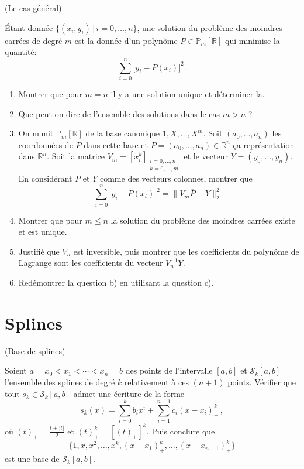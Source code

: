 \documentclass[a4paper,12pt,reqno]{amsart}
\begin{document}
\begin{exo} (Le cas général)

  Étant donnée $\{(x_{i} ,y_{i}) \,|\, i = 0,\ldots,n\}$, une solution du problème des moindres carrées de degré $m$ est la donnée d'un polynôme $P \in \mathbb{P}_{m}[\mathbb{R}]$ qui minimise la quantité:
    $$
        \sum_{i=0}^{n} \big[y_{i} - P(x_{i})\big]^{2}.
    $$

  \begin{enumerate}
    \item Montrer que pour $m=n$ il y a une solution unique et déterminer la.
    \item Que peut on dire de l'ensemble des solutions dans le cas $m>n$ ?
    \item On munit $\mathbb{P}_{m}[\mathbb{R}]$ de la base canonique $1,X,\ldots,X^{m}$. Soit $(a_{0},\ldots,a_{n})$ les coordonnées de $P$ dans cette base et $\overline{P}=(a_{0},\ldots,a_{n}) \in \mathbb{R}^{n}$ ça représentation dans $\mathbb{R}^{n}$. Soit la matrice $V_{m}=\left[x_{i}^{k}\right]_{\substack{i=0,\ldots,n\\ k=0,\ldots,m}}$ et le vecteur $Y=(y_{0},\ldots,y_{n})$. En considérant $\overline{P}$ et $Y$ comme des vecteurs colonnes, montrer que
      $$
        \sum_{i=0}^{n} \big[y_{i} - P(x_{i})\big]^{2} = \big\| V_{m}\overline{P}-Y \big\|_{2}^{2}.
      $$
    \item Montrer que pour $m \leq n$ la solution du problème des moindres carrées existe et est unique.
    \item Justifié que $V_{n}$ est inversible, puis montrer que les coefficients du polynôme de Lagrange sont les coefficients du vecteur $V_{n}^{-1}Y$.
    \item Redémontrer la question b) en utilisant la question c).
  \end{enumerate}
\end{exo}


\section{Splines}

\begin{exo} (Base de splines)

  Soient $a=x_0 < x_1 < \cdots < x_{n}=b$ des points de l'intervalle $[a,b]$ et $\mathcal{S}_{k}[a,b]$ l'ensemble des splines de degré $k$ relativement à ces $(n+1)$ points. Vérifier que tout $s_{k} \in \mathcal{S}_{k}[a,b]$ admet une écriture de la forme
  $$
    s_{k}(x) = \sum_{i=0}^{k} b_{i}x^{i} + \sum_{i=1}^{n-1} c_{i}(x - x_{i})_{+}^{k}\,,
  $$
  où $(t)_{+}=\frac{t+|t|}{2}$ et $(t)_{+}^{k}=\left[(t)_{+}\right]^{k}$. Puis conclure que
    $$
      \{1,x,x^{2},\ldots,x^{k},(x-x_{1})_{+}^{k},\ldots,(x-x_{n-1})_{+}^{k}\}
    $$
  est une base de $\mathcal{S}_{k}[a,b]$.
\end{exo}
\end{document}
